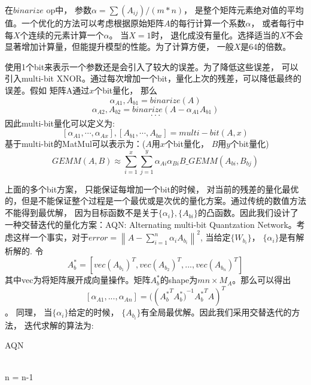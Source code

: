在$binarize$ op中， 参数$\alpha = \sum(A_{ij})/ (m * n)$， 是整个矩阵元素绝对值的平均值。一个优化的方法可以考虑根据原始矩阵$A$的每行计算一个系数$\alpha$， 或者每行中每$X$个连续的元素计算一个$\alpha$。 当$X=1$时， 退化成没有量化。选择适当的$X$不会显著增加计算量，但能提升模型的性能。为了计算方便， 一般$X$是64的倍数。


使用1个bit来表示一个参数还是会引入了较大的误差。为了降低这些误差， 可以引入multi-bit XNOR。通过每次增加一个bit，量化上次的残差，可以降低最终的误差。假如 矩阵A通过$x$个bit量化， 那么
$$\alpha_{A1}, A_{b1} = binarize(A)$$ $$\alpha_{A2}, A_{b2} = binarize(A-\alpha_{A1}A_{b1})$$ $$\cdot\cdot\cdot$$ 
因此multi-bit量化可以定义为:
$$\left[\alpha_{A1},\cdots,\alpha_{Ax}\right],\left[A_{b1},\cdots,A_{bx}\right] = multi-bit(A, x)$$
基于multi-bit的MatMul可以表示为：($A$用$x$个bit量化， $B$用$y$个bit量化)
$$GEMM(A,B) \approx \sum_{i=1}^{x}\sum_{j=1}^{y}\alpha_{Ai}\alpha_{Bi}B\_GEMM(A_{bi}, B_{bj})$$

上面的多个bit方案， 只能保证每增加一个bit的时候， 对当前的残差的量化最优的，但是不能保证整个过程是一个最优或是次优的量化方案。通过传统的数值方法不能得到最优解， 因为目标函数不是关于$\{\alpha_i\},\{A_{bi}\}$的凸函数。因此我们设计了一种交替迭代的量化方案：AQN: Alternating multi-bit Quantzation Network。考虑这样一个事实，对于$ error = \left\| A - \sum_{i=1}^{n} \alpha_i A_{b_i} \right\|^2$, 当给定$\{W_{b_i}\}$， $\{\alpha_i\}$是有解析解的. 令$$A_b^{\ast}=\left[vec(A_{b_1})^T, vec(A_{b_2})^T,...,vec(A_{b_n})^T\right]$$ 其中vec为将矩阵展开成向量操作。矩阵$A_b^{\ast} $的shape为$mn \times M_A$。那么可以得出 $$\left[\alpha_{A1}, ..., \alpha_{An}\right] = (({A^{\ast}_b}^T {A^{\ast}_b)}^{-1}{A_b^{\ast}}^T A)^T$$。 同理， 当$\{\alpha_i\}$给定的时候， $\{A_{b_i}\}$有全局最优解。因此我们采用交替迭代的方法， 迭代求解的算法为:
\begin{algorithm}  
\caption{AQN}  
\label{alg:AQN}  
\begin{algorithmic}  
\REPEAT
{} \\ n = n-1
\end{algorithmic}  
\end{algorithm} 



